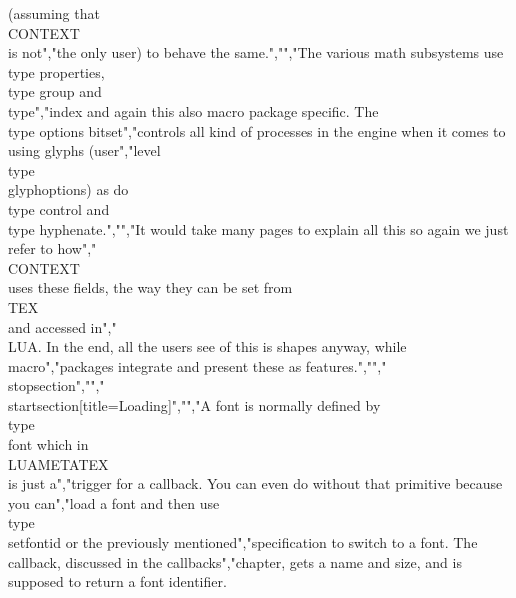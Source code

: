 (assuming that \\CONTEXT\\ is not","the only user) to behave the same.","","The various math subsystems use \\type {properties}, \\type {group} and \\type","{index} and again this also macro package specific. The \\type {options} bitset","controls all kind of processes in the engine when it comes to using glyphs (user","level \\type {\\glyphoptions}) as do \\type {control} and \\type {hyphenate}.","","It would take many pages to explain all this so again we just refer to how","\\CONTEXT\\ uses these fields, the way they can be set from \\TEX\\ and accessed in","\\LUA. In the end, all the users see of this is shapes anyway, while macro","packages integrate and present these as features.","","\\stopsection","","\\startsection[title={Loading}]","","A font is normally defined by \\type {\\font} which in \\LUAMETATEX\\ is just a","trigger for a callback. You can even do without that primitive because you can","load a font and then use \\type {\\setfontid} or the previously mentioned","specification to switch to a font. The callback, discussed in the callbacks","chapter, gets a name and size, and is supposed to return a font identifier. 